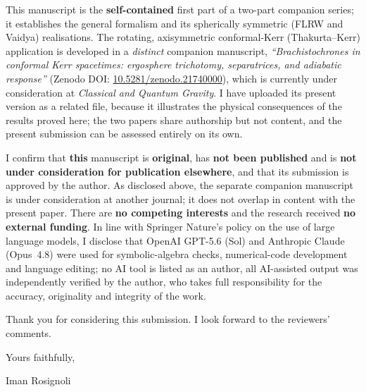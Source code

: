 \documentclass[11pt]{article}
\begin{document}
This manuscript is the \textbf{self-contained} first part of a two-part companion series;
it establishes the general formalism and its spherically symmetric (FLRW and Vaidya)
realisations. The rotating, axisymmetric conformal-Kerr (Thakurta--Kerr) application is
developed in a \emph{distinct} companion manuscript, \emph{``Brachistochrones in conformal
Kerr spacetimes: ergosphere trichotomy, separatrices, and adiabatic response''}
(Zenodo DOI: \href{https://doi.org/10.5281/zenodo.21740000}{10.5281/zenodo.21740000}),
which is currently under consideration at \emph{Classical and Quantum Gravity}. I have
uploaded its present version as a related file, because it illustrates the physical
consequences of the results proved here; the two papers share authorship but not content,
and the present submission can be assessed entirely on its own.

I confirm that \textbf{this} manuscript is \textbf{original}, has \textbf{not been
published} and is \textbf{not under consideration for publication elsewhere}, and that its
submission is approved by the author. As disclosed above, the separate companion
manuscript is under consideration at another journal; it does not overlap in content with
the present paper. There are \textbf{no competing interests} and the research received
\textbf{no external funding}. In line with Springer Nature's policy on the use of large
language models, I disclose that OpenAI GPT-5.6 (Sol) and Anthropic Claude (Opus~4.8) were
used for symbolic-algebra checks, numerical-code development and language editing; no AI
tool is listed as an author, all AI-assisted output was independently verified by the
author, who takes full responsibility for the accuracy, originality and integrity of the
work.

Thank you for considering this submission. I look forward to the reviewers' comments.

\vspace{0.3em}
\noindent Yours faithfully,

\vspace{0.9em}
\noindent Iman Rosignoli
\end{document}
